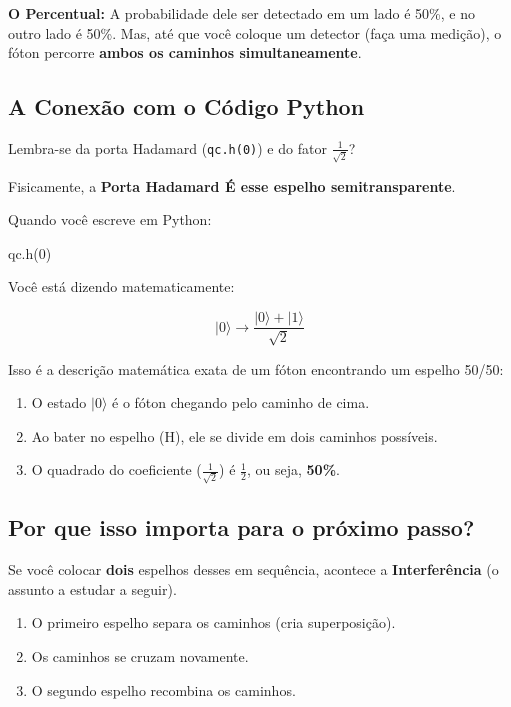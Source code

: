 \documentclass[
  brazilian,
]{report}
\newenvironment{Shaded}{\begin{snugshade}}{\end{snugshade}}
\newcommand{\DecValTok}[1]{\textcolor[rgb]{0.68,0.00,0.00}{#1}}
\newcommand{\NormalTok}[1]{\textcolor[rgb]{0.00,0.23,0.31}{#1}}
\providecommand{\tightlist}{%
  \setlength{\itemsep}{0pt}\setlength{\parskip}{0pt}}
\begin{document}
\textbf{O Percentual:} A probabilidade dele ser detectado em um lado é
50\%, e no outro lado é 50\%. Mas, até que você coloque um detector
(faça uma medição), o fóton percorre \textbf{ambos os caminhos
simultaneamente}.

\subsection{A Conexão com o Código
Python}\label{a-conexuxe3o-com-o-cuxf3digo-python}

Lembra-se da porta Hadamard (\texttt{qc.h(0)}) e do fator
\(\frac{1}{\sqrt{2}}\)?

Fisicamente, a \textbf{Porta Hadamard É esse espelho semitransparente}.

Quando você escreve em Python:

\begin{Shaded}
\begin{Highlighting}[]
\NormalTok{qc.h(}\DecValTok{0}\NormalTok{)}
\end{Highlighting}
\end{Shaded}

Você está dizendo matematicamente:

\[|0\rangle \rightarrow \frac{|0\rangle + |1\rangle}{\sqrt{2}}\]

Isso é a descrição matemática exata de um fóton encontrando um espelho
50/50:

\begin{enumerate}
\def\labelenumi{\arabic{enumi}.}
\tightlist
\item
  O estado \(|0\rangle\) é o fóton chegando pelo caminho de cima.
\item
  Ao bater no espelho (H), ele se divide em dois caminhos possíveis.
\item
  O quadrado do coeficiente (\(\frac{1}{\sqrt{2}}\)) é \(\frac{1}{2}\),
  ou seja, \textbf{50\%}.
\end{enumerate}

\subsection{Por que isso importa para o próximo
passo?}\label{por-que-isso-importa-para-o-pruxf3ximo-passo}

Se você colocar \textbf{dois} espelhos desses em sequência, acontece a
\textbf{Interferência} (o assunto a estudar a seguir).

\begin{enumerate}
\def\labelenumi{\arabic{enumi}.}
\tightlist
\item
  O primeiro espelho separa os caminhos (cria superposição).
\item
  Os caminhos se cruzam novamente.
\item
  O segundo espelho recombina os caminhos.
\end{enumerate}
\end{document}

